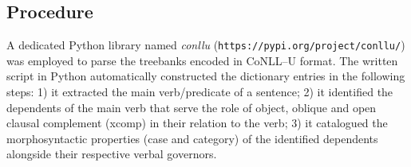 \begin{table}[!h]
	\centering
	\caption{List of treebanks employed in the corpus study}
	\label{treebanks_table}
\end{table}

\subsection{Procedure}
A dedicated Python library named \textit{conllu} (\texttt{https://pypi.org/project/conllu/}) was employed to parse the treebanks encoded in CoNLL--U format. The written script in Python automatically constructed the dictionary entries in the following steps: 1) it extracted the main verb/predicate of a sentence; 2) it identified the dependents of the main verb that serve the role of object, oblique and open clausal complement (xcomp) in their relation to the verb; 3) it catalogued the morphosyntactic properties (case and category) of the identified dependents alongside their respective verbal governors.  

